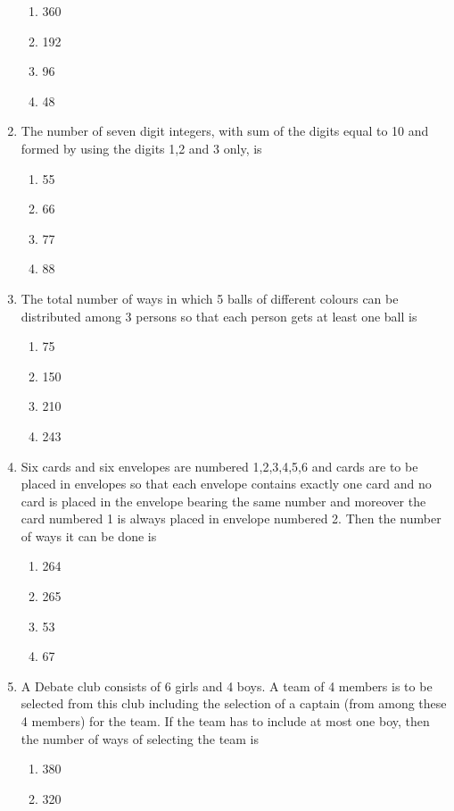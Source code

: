 \documentclass[journal,12pt,twocolumn]{IEEEtran}
\begin{document}
\begin{enumerate}
\begin{enumerate}
\item 360
\item 192
\item 96
\item 48\\
\end{enumerate}
\item The number of seven digit integers, with sum of the digits equal to 10 and formed by using the digits 1,2 and 3 only, is
\begin{enumerate}
\item 55
\item 66
\item 77
\item 88\\
\end{enumerate}
\item The total number of ways in which 5 balls of different colours can be distributed among 3 persons so that each person gets at least one ball is 
\begin{enumerate}
\item 75
\item 150
\item 210
\item 243\\
\end{enumerate}
\item Six cards and six envelopes are numbered 1,2,3,4,5,6 and cards are to be placed in envelopes so that each envelope contains exactly one card and no card is placed in the envelope bearing the same number and moreover the card numbered 1 is always placed in envelope numbered 2. Then the number of ways it can be done is 
\begin{enumerate}
\item 264
\item 265
\item 53
\item 67\\
\end{enumerate} 
\item A Debate club consists of 6 girls and 4 boys. A team of 4 members is to be selected from this club including the selection of a captain (from among these 4 members) for the team. If the team has to include  at most one boy, then the number of ways of selecting the team is 
\begin{enumerate}
\item 380
\item 320

\end{enumerate}
\end{enumerate}
\end{document}
